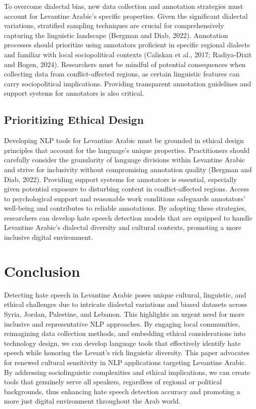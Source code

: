 \documentclass[11pt]{article}
\begin{document}
To overcome dialectal bias, new data collection and annotation strategies must account for Levantine Arabic's specific properties. Given the significant dialectal variations, stratified sampling techniques are crucial for comprehensively capturing the linguistic landscape (Bergman and Diab, 2022). Annotation processes should prioritize using annotators proficient in specific regional dialects and familiar with local sociopolitical contexts (Caliskan et al., 2017; Radiya-Dixit and Bogen, 2024). Researchers must be mindful of potential consequences when collecting data from conflict-affected regions, as certain linguistic features can carry sociopolitical implications. Providing transparent annotation guidelines and support systems for annotators is also critical.


\subsection{Prioritizing Ethical Design}

Developing NLP tools for Levantine Arabic must be grounded in ethical design principles that account for the language's unique properties. Practitioners should carefully consider the granularity of language divisions within Levantine Arabic and strive for inclusivity without compromising annotation quality (Bergman and Diab, 2022). Providing support systems for annotators is essential, especially given potential exposure to disturbing content in conflict-affected regions. Access to psychological support and reasonable work conditions safeguards annotators' well-being and contributes to reliable annotations. By adopting these strategies, researchers can develop hate speech detection models that are equipped to handle Levantine Arabic's dialectal diversity and cultural contexts, promoting a more inclusive digital environment.


\section{Conclusion}

Detecting hate speech in Levantine Arabic poses unique cultural, linguistic, and ethical challenges due to intricate dialectal variations and biased datasets across Syria, Jordan, Palestine, and Lebanon. This highlights an urgent need for more inclusive and representative NLP approaches. By engaging local communities, reimagining data collection methods, and embedding ethical considerations into technology design, we can develop language tools that effectively identify hate speech while honoring the Levant's rich linguistic diversity. This paper advocates for renewed cultural sensitivity in NLP applications targeting Levantine Arabic. By addressing sociolinguistic complexities and ethical implications, we can create tools that genuinely serve all speakers, regardless of regional or political backgrounds, thus enhancing hate speech detection accuracy and promoting a more just digital environment throughout the Arab world.
\end{document}
